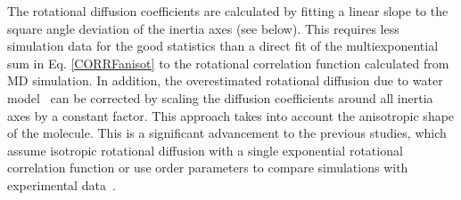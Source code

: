 \documentclass[journal=jpcbfk,manuscript=article]{achemso}
\begin{document}
The rotational diffusion coefficients are calculated by fitting a linear slope to the 
square angle deviation of the inertia axes (see below). This requires less simulation data
for the good statistics than a direct fit of the multiexponential sum in Eq. \ref{CORRFanisot}
to the rotational correlation function calculated from MD simulation.
In addition, the overestimated rotational diffusion due to water model~\cite{wong08} can
be corrected by scaling the diffusion coefficients around all inertia axes
by a constant factor. This approach takes into account the anisotropic shape of
the molecule. This is a significant advancement to the previous studies, which assume
isotropic rotational diffusion with a single exponential rotational correlation
function \cite{showalter07a,showalter07b,maragakis08,gu14,allner15} or
use order parameters to compare simulations with experimental data~\cite{gu14,maragakis08,trbovic08,best04}.
\end{document}
